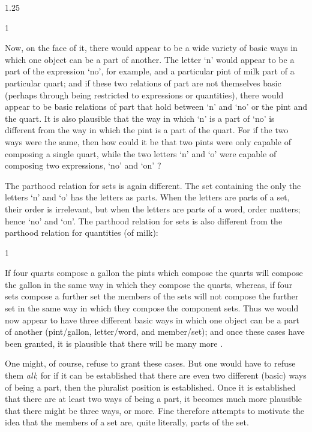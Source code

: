 \documentclass[11pt]{article}
\newenvironment{squote}{%
\begin{spacing}{1}
       	\begin{list}{}{%
\setlength{\labelwidth}{0pt}%
\rightmargin\leftmargin%
}
\item\relax
}{%
\end{list}%
\end{spacing}
}
\begin{document}
\begin{spacing}{1.25}
\begin{squote}
Now, on the face of it, there would appear to be a wide variety of
basic ways in which one object can be a part of another.  The letter
`n' would appear to be a part of the expression `no', for example, and
a particular pint of milk part of a particular quart; and if these two
relations of part are not themselves basic (perhaps through being
restricted to expressions or quantities), there would appear to be
basic relations of part that hold between `n' and `no' or the pint and
the quart.  It is also plausible that the way in which `n' is a part
of `no' is different from the way in which the pint is a part of the
quart.  For if the two ways were the same, then how could it be that
two pints were only capable of composing a single quart, while the two
letters `n' and `o' were capable of composing two expressions, `no'
and `on' \citeyearpar[562]{fine2010}?
\end{squote}

The parthood relation for sets is again different.  The set containing
the only the letters `n' and `o' has the letters as parts.  When the
letters are parts of a set, their order is irrelevant, but when the
letters are parts of a word, order matters; hence `no' and `on'.  The
parthood relation for sets is also different from the parthood
relation for quantities (of milk):

\begin{squote}
If four quarts compose a gallon the pints which compose the quarts
will compose the gallon in the same way in which they compose the
quarts, whereas, if four sets compose a further set the members of the
sets will not compose the further set in the same way in which they
compose the component sets.  Thus we would now appear to have three
different basic ways in which one object can be a part of another
(pint/gallon, letter/word, and member/set); and once these cases have
been granted, it is plausible that there will be many more
\citeyearpar[562]{fine2010}.
\end{squote}

One might, of course, refuse to grant these cases.  But one would have
to refuse them {\em all}; for if it can be established that there are
even two different (basic) ways of being a part, then the pluralist
position is established.  Once it is established that there are at
least two ways of being a part, it becomes much more plausible that
there might be three ways, or more.  Fine therefore attempts to
motivate the idea that the members of a set are, quite literally,
parts of the set.


\end{spacing}
\end{document}
